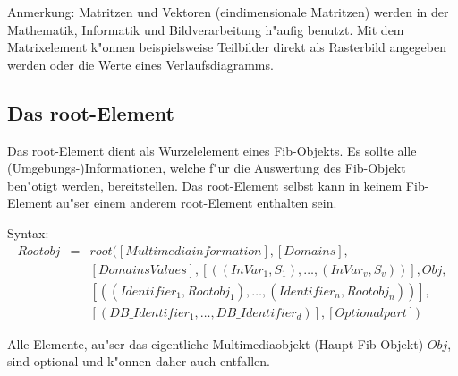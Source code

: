 \bigskip\noindent
Anmerkung:
Matritzen und Vektoren (eindimensionale Matritzen) werden in der Mathematik, Informatik und Bildverarbeitung h"aufig benutzt. Mit dem Matrixelement k"onnen beispielsweise Teilbilder direkt als Rasterbild angegeben werden oder die Werte eines Verlaufsdiagramms.



\subsection{Das root-Element}
\label{fibRootElement}

Das root-Element dient als Wurzelelement eines Fib-Objekts. Es sollte alle (Um\-ge\-bungs-)Informationen, welche f"ur die Auswertung des Fib-Objekt ben"otigt werden, bereitstellen. Das root-Element selbst kann in keinem Fib-Element au"ser einem anderem root-Element enthalten sein.

\bigskip\noindent
Syntax:
\begin{eqnarray*}
Rootobj &=& root( [Multimediainformation], [Domains], \\
&& [DomainsValues], [((InVar_1, S_1), \ldots , (InVar_v, S_v) )],  Obj ,\\
&& [((Identifier_1, Rootobj_1) , \ldots , (Identifier_n, Rootobj_n))],\\
&& [( DB\_Identifier_1, \ldots , DB\_Identifier_d)], [Optionalpart] )
\end{eqnarray*}

Alle Elemente, au"ser das eigentliche Multimediaobjekt (Haupt-Fib-Objekt) $Obj$, sind optional und k"onnen daher auch entfallen.

